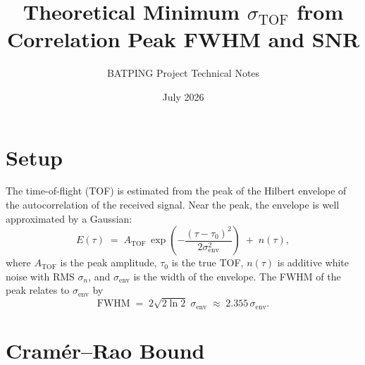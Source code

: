 \documentclass[11pt]{article}
\title{Theoretical Minimum $\sigma_\mathrm{TOF}$ from Correlation Peak FWHM and SNR}
\author{BATPING Project Technical Notes}
\date{July 2026}
\begin{document}
\maketitle

\section{Setup}

The time-of-flight (TOF) is estimated from the peak of the Hilbert envelope of the
autocorrelation of the received signal.  Near the peak, the envelope is well approximated
by a Gaussian:
\begin{equation}
  E(\tau) \;=\; A_\mathrm{TOF}\,\exp\!\left(-\frac{(\tau-\tau_0)^2}{2\sigma_\mathrm{env}^2}\right)
             \;+\; n(\tau),
  \label{eq:envelope}
\end{equation}
where $A_\mathrm{TOF}$ is the peak amplitude, $\tau_0$ is the true TOF,
$n(\tau)$ is additive white noise with RMS $\sigma_n$, and $\sigma_\mathrm{env}$
is the width of the envelope.  The FWHM of the peak relates to $\sigma_\mathrm{env}$ by
\begin{equation}
  \mathrm{FWHM} \;=\; 2\sqrt{2\ln 2}\;\sigma_\mathrm{env} \;\approx\; 2.355\,\sigma_\mathrm{env}.
  \label{eq:fwhm}
\end{equation}

\section{Cramér--Rao Bound}
\end{document}
